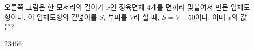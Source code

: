 \noindent\begin{minipage}[t]{0.58\linewidth}\vspace{0pt}\raggedright 오른쪽 그림은 한 모서리의 길이가 $x$인 정육면체 $4$개를 면끼리 맞붙여서 만든 입체도형이다. 이 입체도형의 겉넓이를 $S$, 부피를 $V$라 할 때, $S=V-50$이다. 이때 $x$의 값은?\end{minipage}\hfill\begin{minipage}[t]{0.4\linewidth}\vspace{0pt}\centering \resizebox{\ifdim\width>\linewidth\linewidth\else\width\fi}{!}{}\end{minipage}\par
\begin{choices32}{$2$}{$3$}{$4$}{$5$}{$6$}\end{choices32}
